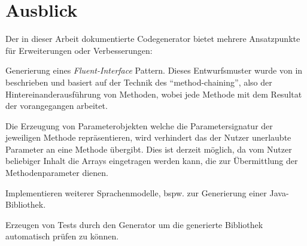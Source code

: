 \section{Ausblick}
\label{sec:prospect}


Der in dieser Arbeit dokumentierte Codegenerator bietet mehrere Ansatzpunkte für Erweiterungen oder Verbesserungen:

\begin{compactitem}
    \item Generierung eines \emph{Fluent-Interface} Pattern. Dieses Entwurfsmuster wurde von \citeauthor{fowler2010domain} in \cite{fowler2010domain} beschrieben und basiert auf der Technik des \enquote{method-chaining}, also der Hintereinanderausführung von Methoden, wobei jede Methode mit dem Resultat der vorangegangen arbeitet.
    \item Die Erzeugung von Parameterobjekten welche die Parametersignatur der jeweiligen Methode repräsentieren, wird verhindert das der Nutzer unerlaubte Parameter an eine Methode übergibt. Dies ist derzeit möglich, da vom Nutzer beliebiger Inhalt die Arrays eingetragen werden kann, die zur Übermittlung der Methodenparameter dienen.
    \item Implementieren weiterer Sprachenmodelle, bspw. zur Generierung einer Java-Bibliothek. 
    \item Erzeugen von Tests durch den Generator um die generierte Bibliothek automatisch prüfen zu können.
\end{compactitem}